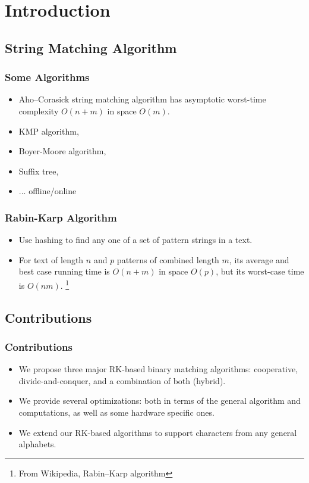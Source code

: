 \section{Introduction}

\subsection{String Matching Algorithm}

\begin{frame}
	\frametitle{Some Algorithms}
	\begin{itemize}
		\setlength\itemsep{1em}
		\item Aho–Corasick string matching algorithm has asymptotic 
		worst-time complexity $O(n+m)$ in space $O(m)$.
		\item KMP algorithm,
		\item Boyer-Moore algorithm,
		\item Suffix tree,
		\item ... offline/online
	\end{itemize}
\end{frame}

\begin{frame}
    \frametitle{Rabin-Karp Algorithm}
	\begin{itemize}
		\setlength\itemsep{1em}
		\item Use hashing to find any one of a set of pattern 
			strings in a text.
		\item For text of length $n$ and $p$ patterns of combined 
		length $m$, its average and best case running time is $O(n+m)$
		 in space $O(p)$, but its worst-case time is $O(nm)$.
		\footnote{From Wikipedia, Rabin–Karp algorithm}
	\end{itemize}
\end{frame}


\begin{frame}

\end{frame}

\subsection{Contributions}
\begin{frame}
	\frametitle{Contributions}
	\begin{itemize}
		\setlength\itemsep{1em}
		\item We propose three major RK-based binary matching algorithms:
			cooperative, divide-and-conquer, and a combination of 
			both (hybrid).
		\item We provide several optimizations: both in terms of the
			general algorithm and computations, as well as some
			hardware specific ones.
		\item We extend our RK-based algorithms to support characters
			from any general alphabets.
	\end{itemize}
\end{frame}